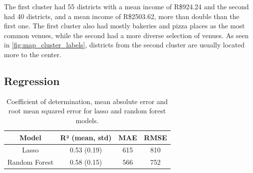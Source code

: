 \documentclass[12pt]{article}
\begin{document}
\newpage

The first cluster had 55 districts with a mean income of R\$924.24 and the
second had 40 districts, and a mean income of R\$2503.62, more than double than
the first one. The first cluster also had mostly bakeries and pizza places as the
most common venues, while the second had a more diverse selection of venues. As seen in \autoref{fig:map_cluster_labels}, districts
from the second cluster are usually located more to the center.



\subsection{Regression}

\begin{table}[h]
        \centering
        \begin{tabular}[c]{ c c c c }
                \toprule
                Model & R² (mean, std) & MAE & RMSE \\
                \midrule
                Lasso & 0.53 (0.19) & 615 & 810 \\
                Random Forest & 0.58 (0.15) & 566 & 752 \\                \bottomrule
        \end{tabular}
        \caption{Coefficient of determination, mean absolute error and root
        mean squared error for lasso and random forest
        models.\label{tab:models}}
\end{table}
\end{document}

